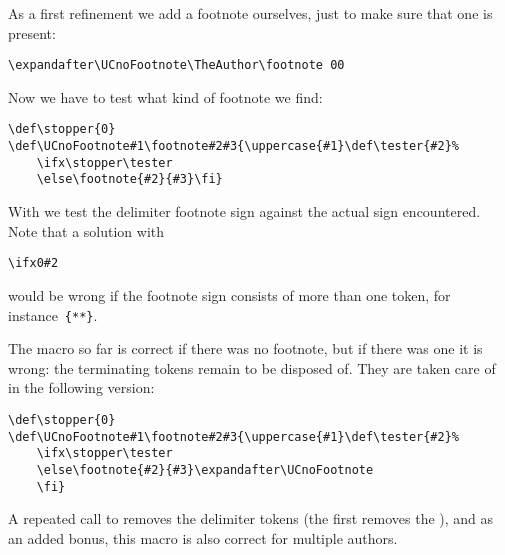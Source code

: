 As a first refinement we add a footnote ourselves, just to make
sure that one is present:
\begin{verbatim}
\expandafter\UCnoFootnote\TheAuthor\footnote 00
\end{verbatim}
Now we have to test what kind of footnote we find:
\begin{verbatim}
\def\stopper{0}
\def\UCnoFootnote#1\footnote#2#3{\uppercase{#1}\def\tester{#2}%
    \ifx\stopper\tester
    \else\footnote{#2}{#3}\fi}
\end{verbatim}
With  we test the delimiter footnote sign against the
actual sign encountered. Note that a solution with
\begin{verbatim}
\ifx0#2
\end{verbatim}
would be wrong if the footnote sign consists
of more than one token, for instance~\verb>{**}>.

The macro so far is correct if there was no footnote,
but if there was one it is wrong:
the terminating tokens remain to be disposed of.
They are taken care of in the following version:
\begin{verbatim}
\def\stopper{0}
\def\UCnoFootnote#1\footnote#2#3{\uppercase{#1}\def\tester{#2}%
    \ifx\stopper\tester
    \else\footnote{#2}{#3}\expandafter\UCnoFootnote
    \fi}
\end{verbatim}
A repeated call to  removes the delimiter tokens
(the  first removes the ),
and as an added bonus, this macro is also correct for multiple
authors.


